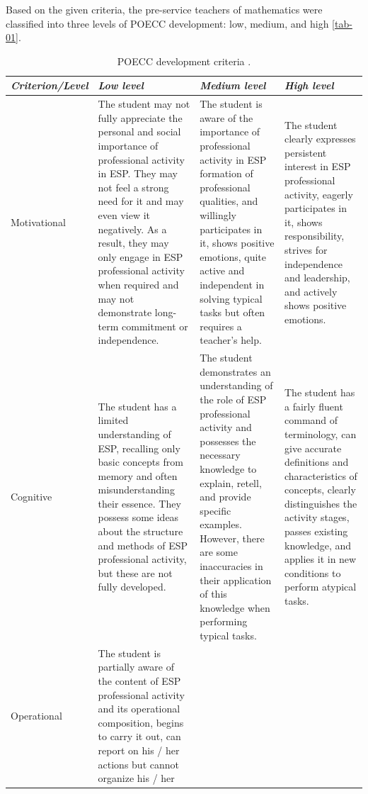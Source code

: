 Based on the given criteria, the pre-service teachers of mathematics were classified into three levels of POECC development: low, medium, and high \cref{tab-01}.

	\begin{table}[!htpb]
	\centering
	\caption{POECC development criteria \cite{dmitrenko2020autonomous}.}
	\label{tab-02}
	\begin{threeparttable}
    \begin{tabular}{ l p{4cm} p{4cm} p{4cm}}
    \toprule
	\emph{Criterion/Level} & \emph{Low level} & \emph{Medium level} & \emph{High level} \\
	\midrule
	Motivational & The student may not fully appreciate the personal and
				social importance of professional activity in ESP. They may not feel a
				strong need for it and may even view it negatively. As a result, they
				may only engage in ESP professional activity when required and may not
				demonstrate long-term commitment or independence. & The student is aware
				of the importance of professional activity in ESP formation of
				professional qualities, and willingly participates in it, shows positive
				emotions, quite active and independent in solving typical tasks but
				often requires a teacher's help. & The student clearly expresses
				persistent interest in ESP professional activity, eagerly 
				participates in it, shows responsibility, strives for independence and
				leadership, and actively shows positive emotions. \\
				Cognitive & The student has a limited understanding of ESP, recalling
				only basic concepts from memory and often misunderstanding their
				essence. They possess some ideas about the structure and methods of ESP
				professional activity, but these are not fully developed. & The student
				demonstrates an understanding of the role of ESP professional activity
				and possesses the necessary knowledge to explain, retell, and provide
				specific examples. However, there are some inaccuracies in their
				application of this knowledge when performing typical tasks. & The
				student has a fairly fluent command of terminology, can give accurate
				definitions and characteristics of concepts, clearly distinguishes the
				activity stages, passes existing knowledge, and applies it in new
				conditions to perform atypical tasks. \\
				Operational & The student is partially aware of the content of ESP
				professional activity and its operational composition, begins to carry
				it out, can report on his / her actions but cannot organize his / her

\end{tabular}
\end{threeparttable}
\end{table}

